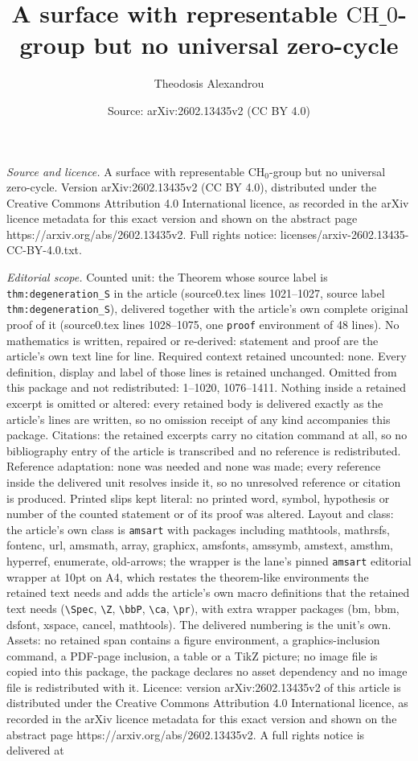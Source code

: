 \documentclass[10pt,a4paper]{amsart}
\title[A surface with representable $\text{CH}\_{0}$-group but no un]{A surface with representable $\text{CH}\_{0}$-group but no universal zero-cycle}
\author{Theodosis Alexandrou}
\date{Source: arXiv:2602.13435v2 (CC BY 4.0)}
\begin{document}
\maketitle

\noindent\emph{Source and licence.} A surface with representable $\text{CH}_{0}$-group but no universal zero-cycle. Version arXiv:2602.13435v2 (CC BY 4.0), distributed under the Creative Commons Attribution 4.0 International licence, as recorded in the arXiv licence metadata for this exact version and shown on the abstract page https://arxiv.org/abs/2602.13435v2. Full rights notice: licenses/arxiv-2602.13435-CC-BY-4.0.txt.\par\smallskip

\noindent\textit{Editorial scope.} Counted unit: the Theorem whose source label is \texttt{thm:degeneration\_S} in the article (source0.tex lines 1021--1027, source label \texttt{thm:degeneration\_S}), delivered together with the article's own complete original proof of it (source0.tex lines 1028--1075, one \texttt{proof} environment of 48 lines). No mathematics is written, repaired or re-derived: statement and proof are the article's own text line for line. Required context retained uncounted: none. Every definition, display and label of those lines is retained unchanged. Omitted from this package and not redistributed: 1--1020, 1076--1411. Nothing inside a retained excerpt is omitted or altered: every retained body is delivered exactly as the article's lines are written, so no omission receipt of any kind accompanies this package. Citations: the retained excerpts carry no citation command at all, so no bibliography entry of the article is transcribed and no reference is redistributed. Reference adaptation: none was needed and none was made; every reference inside the delivered unit resolves inside it, so no unresolved reference or citation is produced. Printed slips kept literal: no printed word, symbol, hypothesis or number of the counted statement or of its proof was altered. Layout and class: the article's own class is \texttt{amsart} with packages including mathtools, mathrsfs, fontenc, url, amsmath, array, graphicx, amsfonts, amssymb, amstext, amsthm, hyperref, enumerate, old-arrows; the wrapper is the lane's pinned \texttt{amsart} editorial wrapper at 10pt on A4, which restates the theorem-like environments the retained text needs and adds the article's own macro definitions that the retained text needs (\texttt{\textbackslash Spec}, \texttt{\textbackslash Z}, \texttt{\textbackslash bbP}, \texttt{\textbackslash ca}, \texttt{\textbackslash pr}), with extra wrapper packages (bm, bbm, dsfont, xspace, cancel, mathtools). The delivered numbering is the unit's own. Assets: no retained span contains a figure environment, a graphics-inclusion command, a PDF-page inclusion, a table or a TikZ picture; no image file is copied into this package, the package declares no asset dependency and no image file is redistributed with it. Licence: version arXiv:2602.13435v2 of this article is distributed under the Creative Commons Attribution 4.0 International licence, as recorded in the arXiv licence metadata for this exact version and shown on the abstract page https://arxiv.org/abs/2602.13435v2. A full rights notice is delivered at 
\end{document}
